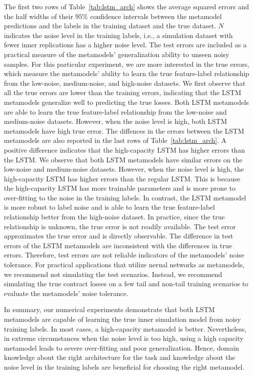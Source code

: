 The first two rows of Table~\ref{tab:lstm_arch} shows the average squared errors and the half widths of their $95\%$ confidence intervals between the metamodel predictions and the labels in the training dataset and the true dataset.
$N$ indicates the noise level in the training labels, i.e., a simulation dataset with fewer inner replications has a higher noise level.
The test errors are included as a practical measure of the metamodels' generalization ability to unseen noisy samples.
For this particular experiment, we are more interested in the true errors, which measure the metamodels' ability to learn the true feature-label relationship from the low-noise, medium-noise, and high-noise datasets.
We first observe that all the true errors are lower than the training errors, indicating that the LSTM metamodels generalize well to predicting the true losses.
Both LSTM metamodels are able to learn the true feature-label relationship from the low-noise and medium-noise datasets.
However, when the noise level is high, both LSTM metamodels have high true error.
The diffences in the errors between the LSTM metamodels are also reported in the last rows of Table~\ref{tab:lstm_arch}.
A positive difference indicates that the high-capacity LSTM has higher errors than the LSTM.
We observe that both LSTM metamodels have similar errors on the low-noise and medium-noise datasets.
However, when the noise level is high, the high-capacity LSTM has higher errors than the regular LSTM.
This is because the high-capacity LSTM has more trainable parameters and is more prone to over-fitting to the noise in the training labels.
In contrast, the LSTM metamodel is more robust to label noise and is able to learn the true feature-label relationship better from the high-noise dataset.
In practice, since the true relationship is unknown, the true error is not readily available.
The test error approximates the true error and is directly observable.
The difference in test errors of the LSTM metamodels are inconsistent with the differences in true errors.
Therefore, test errors are not reliable indicators of the metamodels' noise tolerance.
For practical applications that utilize nerual networks as metamodels, we recommend not simulating the test scenarios.
Instead, we recommend simulating the true contract losses on a few tail and non-tail training scenarios to evaluate the metamodels' noise tolerance.

In summary, our numerical experiments demonstrate that both LSTM metamodels are capable of learning the true inner simulation model from noisy training labels.
In most cases, a high-capacity metamodel is better.
Nevertheless, in extreme circumstances when the noise level is too high, using a high capacity metamodel leads to severe over-fitting and poor generalization.
Hence, domain knowledge about the right architecture for the task and knowledge about the noise level in the training labels are beneficial for choosing the right metamodel.

